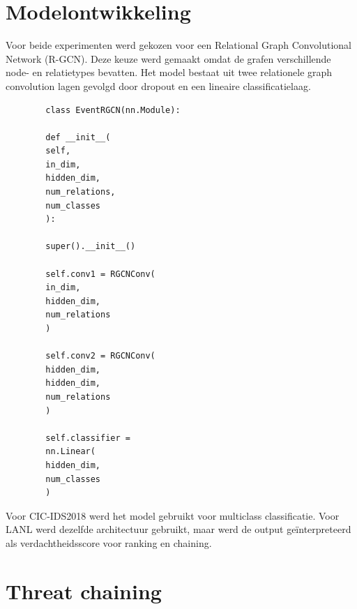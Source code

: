 \section{Modelontwikkeling}

Voor beide experimenten werd gekozen voor een Relational Graph Convolutional Network (R-GCN).
\newline
\newline
Deze keuze werd gemaakt omdat de grafen verschillende node- en relatietypes bevatten.
\newline
\newline
Het model bestaat uit twee relationele graph convolution lagen gevolgd door dropout en een lineaire classificatielaag.

\begin{listing}[H]
    \begin{verbatim}
        class EventRGCN(nn.Module):
        
        def __init__(
        self,
        in_dim,
        hidden_dim,
        num_relations,
        num_classes
        ):
        
        super().__init__()
        
        self.conv1 = RGCNConv(
        in_dim,
        hidden_dim,
        num_relations
        )
        
        self.conv2 = RGCNConv(
        hidden_dim,
        hidden_dim,
        num_relations
        )
        
        self.classifier =
        nn.Linear(
        hidden_dim,
        num_classes
        )
    \end{verbatim}
    
    \caption[R-GCN architectuur]
    {Gebruikte R-GCN modelarchitectuur.}
    
    \label{code:rgcn-model}
\end{listing}

Voor CIC-IDS2018 werd het model gebruikt voor multiclass classificatie.
\newline
\newline
Voor LANL werd dezelfde architectuur gebruikt, maar werd de output geïnterpreteerd als verdachtheidsscore voor ranking en chaining.

\section{Threat chaining}

